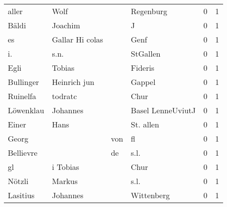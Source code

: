 \begin{tabular}{llllrr}
                    aller &                               Wolf &             &                                   Regenburg &          0 &         1 \\
                    Bäldi &                            Joachim &             &                                           J &          0 &         1 \\
                       es &                    Gallar Hi colas &             &                                        Genf &          0 &         1 \\
                       i. &                               s.n. &             &                                    StGallen &          0 &         1 \\
                     Egli &                             Tobias &             &                                     Fideris &          0 &         1 \\
                Bullinger &                       Heinrich jun &             &                                      Gappel &          0 &         1 \\
                 Ruinelfa &                            todratc &             &                                        Chur &          0 &         1 \\
                Löwenklau &                           Johannes &             &                           Basel LenneUviutJ &          0 &         1 \\
                    Einer &                               Hans &             &                                   St. allen &          0 &         1 \\
                    Georg &                                    &         von &                                          fl &          0 &         1 \\
                Bellievre &                                    &          de &                                        s.l. &          0 &         1 \\
                       gl &                           i Tobias &             &                                        Chur &          0 &         1 \\
                   Nötzli &                             Markus &             &                                        s.l. &          0 &         1 \\
                 Lasitius &                           Johannes &             &                                  Wittenberg &          0 &         1 \\

\end{tabular}
